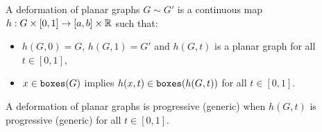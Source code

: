 A deformation of planar graphs $G \sim G'$ is a continuous map $h : G \times [0, 1] \to [a, b] \times \mathbb{R}$ such that:
\begin{itemize}
\item $h(G, 0) = G$, $h(G, 1) = G'$ and $h(G, t)$ is a planar graph for all $t \in [0, 1]$,
\item $x \in \mathtt{boxes}(G)$ implies $h(x, t) \in \mathtt{boxes}(h(G, t))$ for all $t \in [0, 1]$.
\end{itemize}
A deformation of planar graphs is progressive (generic) when $h(G, t)$ is progressive (generic) for all $t \in [0, 1]$.
